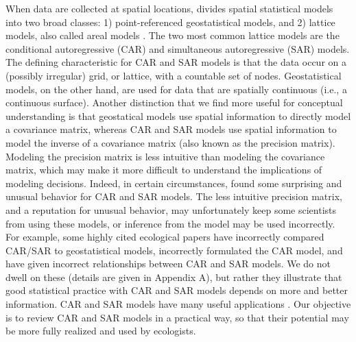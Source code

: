 \documentclass[11pt, titlepage]{article}\usepackage[]{graphicx}\usepackage[]{color}
\begin{document}
\begin{spacing}{1.9}
\begin{flushleft}
When data are collected at spatial locations, \citet[][p. 8]{Cres:stat:1993} divides spatial statistical models into two broad classes: 1) point-referenced geostatistical models, and 2) lattice models, also called areal models \citep{Bane:Carl:Gelf:hier:2014}.  The two most common lattice models are the conditional autoregressive (CAR) and simultaneous autoregressive (SAR) models. The defining characteristic for CAR and SAR models is that the data occur on a (possibly irregular) grid, or lattice, with a countable set of nodes.  Geostatistical models, on the other hand, are used for data that are spatially continuous (i.e., a continuous surface). Another distinction that we find more useful for conceptual understanding is that geostatical models use spatial information to directly model a covariance matrix, whereas CAR and SAR models use spatial information to model the inverse of a covariance matrix (also known as the precision matrix).  Modeling the precision matrix is less intuitive than modeling the covariance matrix, which may make it more difficult to understand the implications of modeling decisions.  Indeed, in certain circumstances, \citet{Wall:clos:2004} found some surprising and unusual behavior for CAR and SAR models. The less intuitive precision matrix, and a reputation for unusual behavior, may unfortunately keep some scientists from using these models, or inference from the model may be used incorrectly. For example, some highly cited ecological papers have incorrectly compared CAR/SAR to geostatistical models, incorrectly formulated the CAR model, and have given incorrect relationships between CAR and SAR models. We do not dwell on these (details are given in Appendix A), but rather they illustrate that good statistical practice with CAR and SAR models depends on more and better information. CAR and SAR models have many useful applications \citep[e.g.,][]{Gelf:Schm:Wu:Sila:Lati:mode:2005, Lati:Wu:Gelf:Sila:buil:2006, Mago:Ray:John:Valk:Daws:Bowm:mode:2007, Hank:Hoot:circ:2013}.  Our objective is to review CAR and SAR models in a practical way, so that their potential may be more fully realized and used by ecologists.


\end{flushleft}
\end{spacing}
\end{document}
